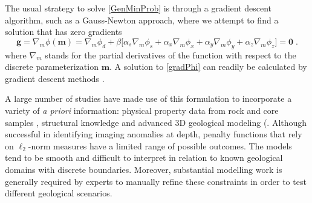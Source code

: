 The usual strategy to solve \eqref{GenMinProb} is through a gradient descent algorithm, such as a Gauss-Newton approach, where we attempt to find a solution that has zero gradients
\begin{equation}\label{gradPhi}
\mathbf{g} = \nabla_m \phi(\mathbf{m}) = \nabla_m \phi_d + \beta \bigg[ \alpha_s \nabla_m \phi_s + \alpha_x \nabla_m \phi_x + \alpha_y \nabla_m \phi_y + \alpha_z \nabla_m \phi_z \bigg] = \mathbf{0} \;.
\end{equation}
where $\nabla_m$ stands for the partial derivatives of the function with respect to the discrete parameterization $\mathbf{m}$.
A solution to \eqref{gradPhi} can readily be calculated by gradient descent methods \cite[]{HestenesStiefel1952, NocedalWright99}.

A large number of studies have made use of this formulation to incorporate a variety of \emph{a priori} information: physical property data from rock and core samples \cite[]{LelievreOldenburgWilliams09}, structural knowledge \cite[]{LiDWO2000, PhDLelievre09} and advanced 3D geological modeling (\cite[]{Phillips1996, Williams08, Bosh2001, Fullagar2008}.
Although successful in identifying imaging anomalies at depth, penalty functions that rely on $\ell_2$-norm measures have a limited range of possible outcomes. The models tend to be smooth and difficult to interpret in relation to known geological domains with discrete boundaries. Moreover, substantial modelling work is generally required by experts to manually refine these constraints in order to test different geological scenarios.

